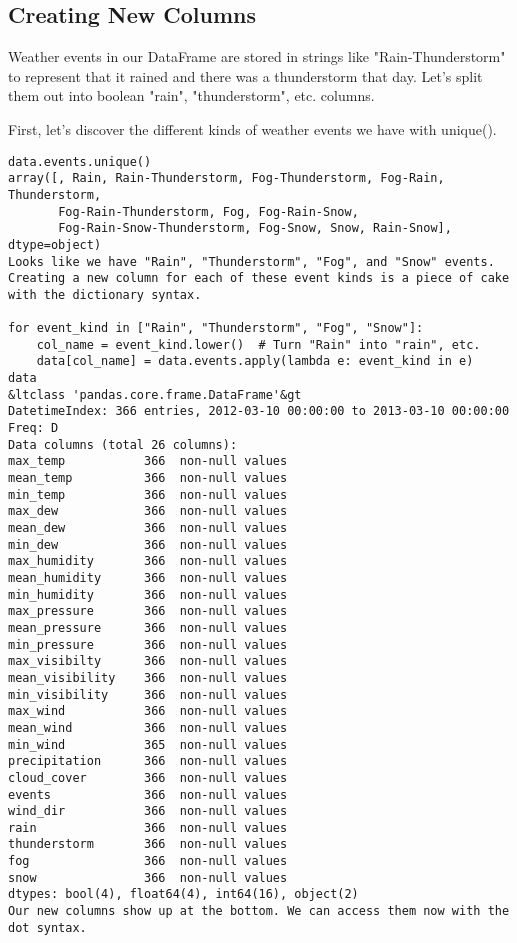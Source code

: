 \subsection{Creating New Columns}
Weather events in our DataFrame are stored in strings like "Rain-Thunderstorm" to represent that it rained and there was a thunderstorm that day. Let's split them out into boolean "rain", "thunderstorm", etc. columns.

First, let's discover the different kinds of weather events we have with unique().
\begin{framed}
\begin{verbatim}
data.events.unique()
array([, Rain, Rain-Thunderstorm, Fog-Thunderstorm, Fog-Rain, Thunderstorm,
       Fog-Rain-Thunderstorm, Fog, Fog-Rain-Snow,
       Fog-Rain-Snow-Thunderstorm, Fog-Snow, Snow, Rain-Snow], dtype=object)
Looks like we have "Rain", "Thunderstorm", "Fog", and "Snow" events. Creating a new column for each of these event kinds is a piece of cake with the dictionary syntax.

for event_kind in ["Rain", "Thunderstorm", "Fog", "Snow"]:
    col_name = event_kind.lower()  # Turn "Rain" into "rain", etc.
    data[col_name] = data.events.apply(lambda e: event_kind in e)
data
&ltclass 'pandas.core.frame.DataFrame'&gt
DatetimeIndex: 366 entries, 2012-03-10 00:00:00 to 2013-03-10 00:00:00
Freq: D
Data columns (total 26 columns):
max_temp           366  non-null values
mean_temp          366  non-null values
min_temp           366  non-null values
max_dew            366  non-null values
mean_dew           366  non-null values
min_dew            366  non-null values
max_humidity       366  non-null values
mean_humidity      366  non-null values
min_humidity       366  non-null values
max_pressure       366  non-null values
mean_pressure      366  non-null values
min_pressure       366  non-null values
max_visibilty      366  non-null values
mean_visibility    366  non-null values
min_visibility     366  non-null values
max_wind           366  non-null values
mean_wind          366  non-null values
min_wind           365  non-null values
precipitation      366  non-null values
cloud_cover        366  non-null values
events             366  non-null values
wind_dir           366  non-null values
rain               366  non-null values
thunderstorm       366  non-null values
fog                366  non-null values
snow               366  non-null values
dtypes: bool(4), float64(4), int64(16), object(2)
Our new columns show up at the bottom. We can access them now with the dot syntax.


\end{verbatim}
\end{framed}
